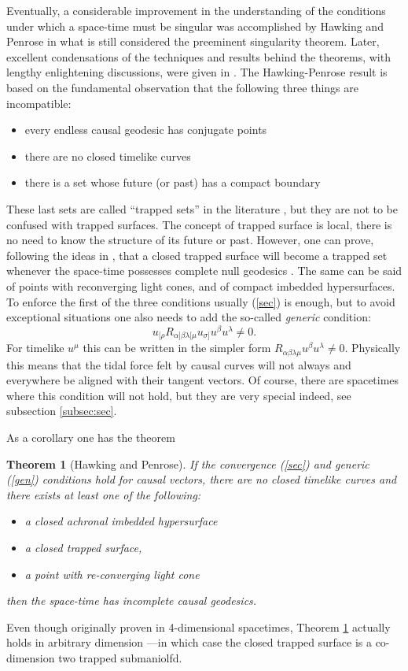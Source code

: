 \documentclass[12pt]{iopart}
\def\be{\begin{equation}}
\def\ee{\end{equation}}
\newtheorem{theorem}{Theorem}
\begin{document}
Eventually, a considerable improvement in the understanding of the conditions under which a space-time must be singular was accomplished by Hawking and Penrose \cite{HP} in what is still considered the preeminent singularity theorem. Later, excellent condensations of the techniques and results behind the theorems, with lengthy enlightening discussions, were given in \cite{HE,P5}. The Hawking-Penrose result is based on the fundamental observation that the following three things are incompatible: 
\begin{itemize}
\item every endless causal geodesic has conjugate points 
\item there are no closed timelike curves
\item there is a set whose future (or past) has a compact boundary
\end{itemize}
These last sets are called ``trapped sets'' in the literature \cite{HE,HP,S1}, but they are not to be confused with trapped surfaces. The concept of trapped surface is local, there is no need to know the structure of its future or past. However, one can prove, following the ideas in \cite{P}, that a closed trapped surface will become a trapped set whenever the space-time possesses complete null geodesics \cite{BE,S1}. The same can be said of points with reconverging light cones, and of compact imbedded hypersurfaces. To enforce the first of the three conditions usually (\ref{sec}) is enough, but to avoid exceptional situations one also needs to add the so-called {\em generic}  condition: 
\be
u_{[\rho}R_{\alpha]\beta\lambda[\mu}u_{\sigma]}u^\beta u^\lambda \neq 0.\label{gen}
\ee
For timelike $u^\mu$ this can be written in the simpler form $R_{\alpha\beta\lambda\mu}u^\beta u^\lambda \neq 0$.
Physically this means that the tidal force felt by causal curves will not always and everywhere be aligned with their tangent vectors. Of course, there are spacetimes where this condition will not hold, but they are very special indeed, see subsection \ref{subsec:sec}.

As a corollary one has the theorem
\begin{theorem}[Hawking and Penrose]\label{th:HP}
If the convergence (\ref{sec}) and generic (\ref{gen}) conditions hold for causal vectors, there are no closed timelike curves and there exists at least one of the following:
\begin{itemize}
\item a closed achronal imbedded hypersurface
\item a closed trapped surface,
\item a point with re-converging light cone
\end{itemize}
then the space-time has incomplete causal geodesics.
\end{theorem}
Even though originally proven in 4-dimensional spacetimes, Theorem \ref{th:HP} actually holds in arbitrary dimension ---in which case the closed trapped surface is a co-dimension two trapped submaniolfd.
\end{document}
